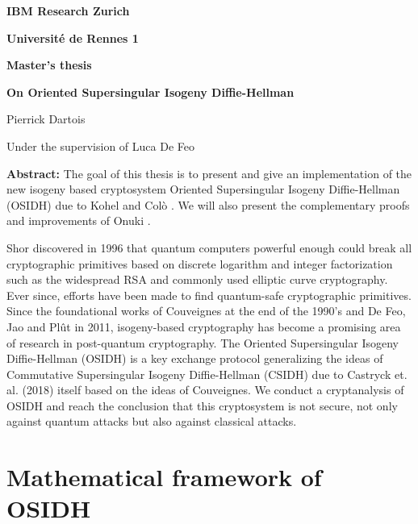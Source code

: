 \documentclass[a4paper,10pt]{report}
\theoremstyle{definition}
\theoremstyle{plain}
\theoremstyle{definition}
\renewcommand{\(}{\left(}
\renewcommand{\)}{\right)}
\begin{document}
\begin{center}

{\LARGE {\bfseries IBM Research Zurich}}

\vspace{0.2cm}

{\LARGE {\bfseries Université de Rennes 1}}

\vspace{1.5cm}

{\LARGE {\bfseries Master's thesis}}

\vspace{1.5cm}

{\huge {\bfseries On Oriented Supersingular Isogeny Diffie-Hellman}}

\vspace{1.5cm}

{\Large Pierrick Dartois}

\vspace{0.5cm}

{\Large Under the supervision of Luca De Feo}

\end{center}

\vspace{2cm}

{\bfseries Abstract:} The goal of this thesis is to present and give an implementation of the new isogeny based cryptosystem Oriented Supersingular Isogeny Diffie-Hellman (OSIDH) due to Kohel and Col\`{o} \cite{OSIDH}.  We will also present the complementary proofs and improvements of Onuki \cite{Onuki}.


Shor discovered in 1996 that quantum computers powerful enough could break all cryptographic primitives based on discrete logarithm and integer factorization such as the widespread RSA and commonly used elliptic curve cryptography.  Ever since, efforts have been made to find quantum-safe cryptographic primitives. Since the foundational works of Couveignes at the end of the 1990's and De Feo, Jao and Pl\^{u}t in 2011, isogeny-based cryptography has become a promising area of research in post-quantum cryptography.   The Oriented Supersingular Isogeny Diffie-Hellman (OSIDH) is a key exchange protocol generalizing the ideas of Commutative Supersingular Isogeny Diffie-Hellman (CSIDH) due to Castryck et. al.  (2018) itself based on the ideas of Couveignes.  We conduct a cryptanalysis of OSIDH and reach the conclusion that this cryptosystem is not secure, not only against quantum attacks but also against classical attacks.

\chapter{Mathematical framework of OSIDH}
\end{document}
